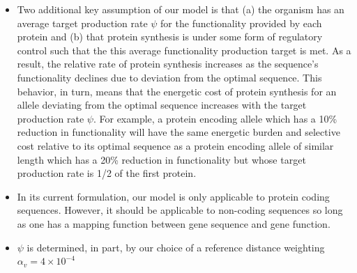 \documentclass{article}
\newcommand{\alphav}{\ensuremath{\alpha_v}\xspace}
\newcommand{\alphavValue}{\ensuremath{4 \times 10^{-4}}\xspace}
\begin{document}
\begin{itemize}
\item Two additional key assumption of our model is that (a) the organism has an average target production rate $\psi$ for the functionality provided by each protein and (b) that protein synthesis is under some form of  regulatory control such that the this average functionality production target is met.
As a result, the relative rate of protein synthesis increases as the sequence's functionality declines due to deviation from the optimal sequence.
This behavior, in turn, means that the energetic cost of protein synthesis for an allele deviating from the optimal sequence increases with the target production rate $\psi$.
For example, a protein encoding allele which has a 10\% reduction in functionality will have the same energetic burden and selective cost relative to its optimal sequence as a protein encoding allele of similar length which has a 20\% reduction in functionality but whose target production rate is 1/2 of the first protein.
\item In its current formulation, our model is only applicable to protein coding sequences.
However, it should be applicable to non-coding sequences so long as one has a mapping function between gene sequence and gene function.
\item $\psi$ is determined, in part, by our choice of a reference distance weighting $\alphav = \alphavValue$
\end{itemize}



\end{document}
